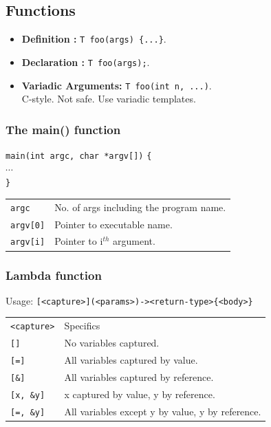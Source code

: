 \subsection{Functions}

\begin{itemize}
\item \textbf{Definition :} \texttt{T foo(args) \{...\}}.\\
\item \textbf{Declaration : } \texttt{T foo(args);}.\\
\item \textbf{Variadic Arguments:} \texttt{T foo(int n, ...)}.\\
                                    C-style. Not safe. Use variadic templates.\\
\end{itemize}

\subsubsection{The main() function}

\texttt{main(int argc, char *argv[])} \texttt{\{}\\
\qquad \texttt{$\cdots$}\\
\texttt{\}}

\begin{tabularx}{\linewidth}{lX}
\texttt{argc} & No. of args including the program name. \\
\texttt{argv[0]} & Pointer to executable name.\\
\texttt{argv[i]} & Pointer to i$^{th}$ argument.\\
\end{tabularx}


\subsubsection{Lambda function}
Usage: \texttt{[<capture>](<params>)-><return-type>\{<body>\}}\\

\begin{tabularx}{\linewidth}{lX}
   \texttt{<capture>}   &  Specifics\\
   \texttt{[]}          & No variables captured.\\
    \texttt{[=]}        & All variables captured by value.\\
    \texttt{[\&]}       & All variables captured by reference.\\
    \texttt{[x, \&y]}   & x captured by value, y by reference.\\
    \texttt{[=, \&y]}   & All variables except y by value, y by reference.\\
\end{tabularx}

